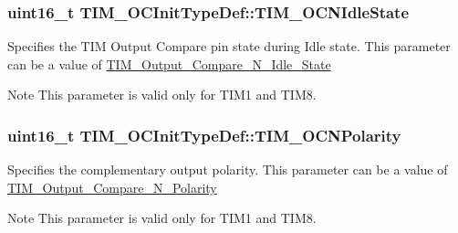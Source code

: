\subsubsection[{\texorpdfstring{T\+I\+M\+\_\+\+O\+C\+N\+Idle\+State}{TIM_OCNIdleState}}]{\setlength{\rightskip}{0pt plus 5cm}uint16\+\_\+t T\+I\+M\+\_\+\+O\+C\+Init\+Type\+Def\+::\+T\+I\+M\+\_\+\+O\+C\+N\+Idle\+State}\hypertarget{struct_t_i_m___o_c_init_type_def_a6cbbe6eb87c2ab49e4d68fa9703ce949}{}\label{struct_t_i_m___o_c_init_type_def_a6cbbe6eb87c2ab49e4d68fa9703ce949}
Specifies the T\+IM Output Compare pin state during Idle state. This parameter can be a value of \hyperlink{group___t_i_m___output___compare___n___idle___state}{T\+I\+M\+\_\+\+Output\+\_\+\+Compare\+\_\+\+N\+\_\+\+Idle\+\_\+\+State} \begin{DoxyNote}{Note}
This parameter is valid only for T\+I\+M1 and T\+I\+M8. 
\end{DoxyNote}
\subsubsection[{\texorpdfstring{T\+I\+M\+\_\+\+O\+C\+N\+Polarity}{TIM_OCNPolarity}}]{\setlength{\rightskip}{0pt plus 5cm}uint16\+\_\+t T\+I\+M\+\_\+\+O\+C\+Init\+Type\+Def\+::\+T\+I\+M\+\_\+\+O\+C\+N\+Polarity}\hypertarget{struct_t_i_m___o_c_init_type_def_a3e47e672810747302c9d0626ae2ccb17}{}\label{struct_t_i_m___o_c_init_type_def_a3e47e672810747302c9d0626ae2ccb17}
Specifies the complementary output polarity. This parameter can be a value of \hyperlink{group___t_i_m___output___compare___n___polarity}{T\+I\+M\+\_\+\+Output\+\_\+\+Compare\+\_\+\+N\+\_\+\+Polarity} \begin{DoxyNote}{Note}
This parameter is valid only for T\+I\+M1 and T\+I\+M8. 
\end{DoxyNote}
